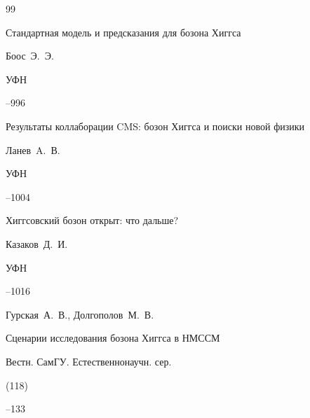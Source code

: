 \begin{thebibliography}{99}






\paper Стандартная модель и предсказания для бозона Хиггса 

\by Боос~Э.~Э. 

\jour УФН




--996





\paper Результаты коллаборации CMS: бозон Хиггса и поиски новой физики 

\by Ланев~A.~В. 

\jour УФН 




--1004







\paper Хиггсовский бозон открыт: что дальше? 

\by Казаков~Д.~И. 

\jour УФН




--1016





\by Гурская~А.~В., Долгополов~М.~В. 

\paper Сценарии исследования бозона Хиггса в НМССМ

\jour Вестн. СамГУ. Естественнонаучн. сер.


(118)

--133







\end{thebibliography}
